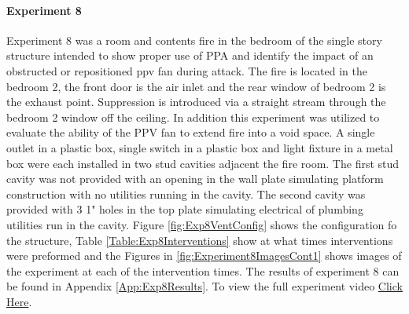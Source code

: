 \documentclass{article}
\begin{document}
\paragraph{Experiment 8}\mbox{}

Experiment 8 was a room and contents fire in the bedroom of the single story structure intended to show proper use of PPA and identify the impact of an obstructed or repositioned ppv fan during attack. The fire is located in the bedroom 2, the front door is the air inlet and the rear window of bedroom 2 is the exhaust point. Suppression is introduced via a straight stream through the bedroom 2 window off the ceiling. In addition this experiment was utilized to evaluate the ability of the PPV fan to extend fire into a void space. A single outlet in a plastic box, single switch in a plastic box and light fixture in a metal box were each installed in two stud cavities adjacent the fire room. The first stud cavity was not provided with an opening in the wall plate simulating platform construction with no utilities running in the cavity. The second cavity was provided with 3 1" holes in the top plate simulating electrical of plumbing utilities run in the cavity. Figure \ref{fig:Exp8VentConfig} shows the configuration fo the structure, Table \ref{Table:Exp8Interventions} show at what times interventions were preformed and the Figures in \ref{fig:Experiment8ImagesCont1} shows images of the experiment at each of the intervention times. The results of experiment 8 can be found in Appendix \ref{App:Exp8Results}. To view the full experiment video \href{https://youtu.be/OzkzBTcsMs0}{Click Here}.
\end{document}

